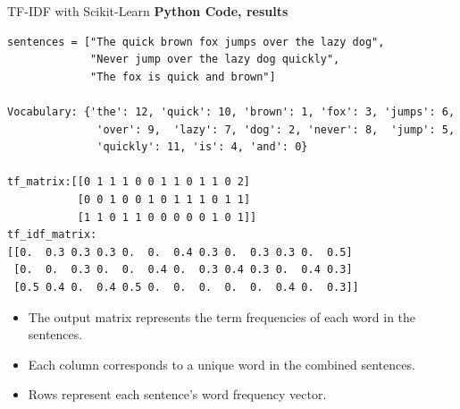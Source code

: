 \documentclass{beamer}
\begin{document}
\begin{frame}[fragile]{TF-IDF with Scikit-Learn}
\small
\textbf{Python Code, results}
\begin{tcolorbox}[colback=lightgray, colframe=lightgray,
                  boxsep=0mm, arc=1mm, boxrule=0mm,
                  left=1mm, right=1mm, top=1mm, bottom=1mm]
\begin{Verbatim}[fontsize=\scriptsize, bgcolor=lightgray]
sentences = ["The quick brown fox jumps over the lazy dog",
             "Never jump over the lazy dog quickly",
             "The fox is quick and brown"]

Vocabulary: {'the': 12, 'quick': 10, 'brown': 1, 'fox': 3, 'jumps': 6,
              'over': 9,  'lazy': 7, 'dog': 2, 'never': 8,  'jump': 5,
              'quickly': 11, 'is': 4, 'and': 0}

tf_matrix:[[0 1 1 1 0 0 1 1 0 1 1 0 2]
           [0 0 1 0 0 1 0 1 1 1 0 1 1]
           [1 1 0 1 1 0 0 0 0 0 1 0 1]]
tf_idf_matrix:
[[0.  0.3 0.3 0.3 0.  0.  0.4 0.3 0.  0.3 0.3 0.  0.5]
 [0.  0.  0.3 0.  0.  0.4 0.  0.3 0.4 0.3 0.  0.4 0.3]
 [0.5 0.4 0.  0.4 0.5 0.  0.  0.  0.  0.  0.4 0.  0.3]]
\end{Verbatim}
\end{tcolorbox}

\begin{itemize}
  \item The output matrix represents the term frequencies of each word in the sentences.
  \item Each column corresponds to a unique word in the combined sentences.
  \item Rows represent each sentence's word frequency vector.
\end{itemize}
\end{frame}
\end{document}
